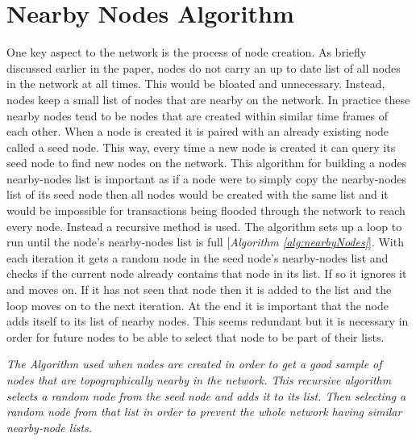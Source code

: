 \documentclass{l4proj}
\begin{document}
\section{Nearby Nodes Algorithm}
One key aspect to the network is the process of node creation. As briefly discussed earlier in the paper, nodes
do not carry an up to date list of all nodes in the network at all times. This would be bloated and unnecessary.
Instead, nodes keep a small list of nodes that are nearby on the network. In practice these nearby
nodes tend to be nodes that are created within similar time frames of each other. When a node is created it is
paired with an already existing node called a seed node. This way, every time a new node is created it can query
its seed node to find new nodes on the network. This algorithm for building a nodes nearby-nodes list is important
as if a node were to simply copy the nearby-nodes list of its seed node then all nodes would be created with the
same list and it would be impossible for transactions being flooded through the network to reach every node. Instead
a recursive method is used. The algorithm sets up a loop to run until the node's nearby-nodes list is full
[\textit{Algorithm \ref{alg:nearbyNodes}}]. With each iteration it gets a random node in the seed node's nearby-nodes list and checks if 
the current node already contains that node in its list. If so it ignores it and moves on. If it has not seen 
that node then it is added to the list and the loop moves on to the next iteration. At the end it is important 
that the node adds itself to its list of nearby nodes. This seems redundant but it is necessary in order for 
future nodes to be able to select that node to be part of their lists.

\begin{algorithm}
    \DontPrintSemicolon
    \vspace{1cm}
    
\caption{
    \textit{The Algorithm used when nodes are created in order to get a good sample of nodes that are topographically nearby
    in the network. This recursive algorithm selects a random node from the seed node and adds it to its list. Then
    selecting a random node from that list in order to prevent the whole network having similar nearby-node lists.}
}
\label{alg:nearbyNodes}
\end{algorithm}
\end{document}
